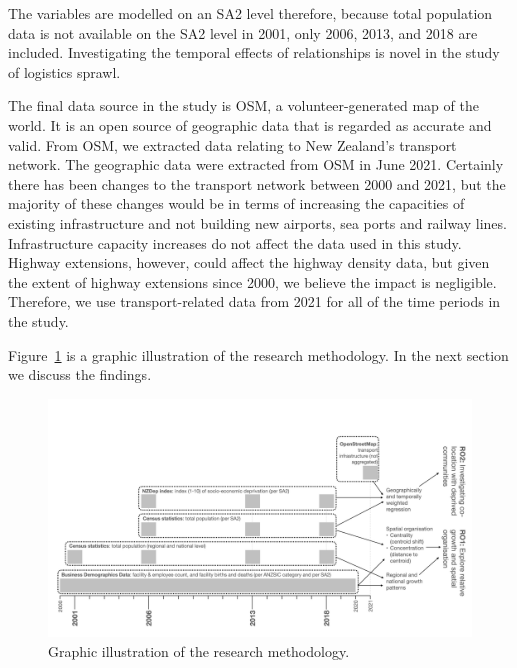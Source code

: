 \documentclass[3p, a4paper, authoryear, 11pt, fleqn, review]{elsarticle}
\newcommand{\nmt}[1]{{\color{ForestGreen}{~(nmt: #1)}}}
\begin{document}
The variables are modelled on an \ac{SA2} level therefore, because total population data is not available on the \ac{SA2} level in 2001, only 2006, 2013, and 2018 are included. Investigating the temporal effects of relationships is novel in the study of logistics sprawl. \nmt{Insert quick recap of literature to prove}


The final data source in the study is \ac{OSM}, a volunteer-generated map of the world. It is an open source of geographic data that is regarded as accurate and valid. From \ac{OSM}, we extracted data relating to New Zealand's transport network. The geographic data were extracted from \ac{OSM} in June 2021. Certainly there has been changes to the transport network between 2000 and 2021, but the majority of these changes would be in terms of increasing the capacities of existing infrastructure and not building new airports, sea ports and railway lines. Infrastructure capacity increases do not affect the data used in this study. Highway extensions, however, could affect the highway density data, but given the extent of highway extensions since 2000, we believe the impact is negligible.\nmt{I still have to substantiate this somehow.} Therefore, we use transport-related data from 2021 for all of the time periods in the study.

Figure~\ref{fig:method} is a graphic illustration of the research methodology. In the next section we discuss the findings.  

\begin{figure}[h!]
    \centering
    \includegraphics[width=0.9\linewidth]{methodology.jpeg}
    \caption{Graphic illustration of the research methodology.}
    \label{fig:method}
\end{figure}

\end{document}

